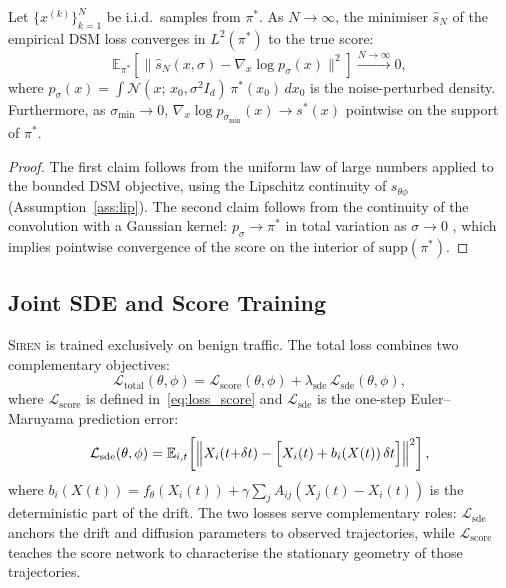 \begin{proposition}
\label{prop:consistency}
Let $\{x^{(k)}\}_{k=1}^N$ be i.i.d.\ samples from $\pi^*$.
As $N \to \infty$, the minimiser $\hat{s}_N$ of the empirical DSM loss
converges in $L^2(\pi^*)$ to the true score:
\begin{equation}
\mathbb{E}_{\pi^*}\!\left[\bigl\|\hat{s}_N(x, \sigma) - \nabla_x \log p_\sigma(x)\bigr\|^2\right]
\xrightarrow{N \to \infty} 0,
\end{equation}
where $p_\sigma(x) = \int \mathcal{N}(x;\, x_0, \sigma^2 I_d)\,\pi^*(x_0)\,dx_0$
is the noise-perturbed density.
Furthermore, as $\sigma_{\min} \to 0$, $\nabla_x \log p_{\sigma_{\min}}(x) \to s^*(x)$
pointwise on the support of $\pi^*$.
\end{proposition}

\begin{proof}
The first claim follows from the uniform law of large numbers applied to the
bounded DSM objective, using the Lipschitz continuity of $s_{\theta\phi}$
(Assumption~\ref{ass:lip}).
The second claim follows from the continuity of the convolution with a
Gaussian kernel: $p_\sigma \to \pi^*$ in total variation as $\sigma \to 0$
\citep[Proposition~3]{Song2019ncsn}, which implies pointwise convergence of
the score on the interior of $\mathrm{supp}(\pi^*)$.
\end{proof}

\subsection{Joint SDE and Score Training}
\label{sec:training}

\textsc{Siren} is trained exclusively on benign traffic.
The total loss combines two complementary objectives:
\begin{equation}\label{eq:loss_total}
\mathcal{L}_{\mathrm{total}}(\theta, \phi)
= \mathcal{L}_{\mathrm{score}}(\theta, \phi)
  + \lambda_{\mathrm{sde}}\,\mathcal{L}_{\mathrm{sde}}(\theta, \phi),
\end{equation}
where $\mathcal{L}_{\mathrm{score}}$ is defined in~\eqref{eq:loss_score} and
$\mathcal{L}_{\mathrm{sde}}$ is the one-step Euler--Maruyama prediction error:
\begin{equation}\label{eq:loss_sde}
\mathcal{L}_{\mathrm{sde}}(\theta, \phi)
= \mathbb{E}_{i, t}\!\left[
    \left\| X_i(t{+}\delta t) -
            \Bigl[X_i(t) + b_i(X(t))\,\delta t\Bigr]
    \right\|^2
  \right],
\end{equation}
where $b_i(X(t)) = f_\theta(X_i(t)) + \gamma\sum_j A_{ij}(X_j(t) - X_i(t))$
is the deterministic part of the drift.
The two losses serve complementary roles: $\mathcal{L}_{\mathrm{sde}}$
anchors the drift and diffusion parameters to observed trajectories, while
$\mathcal{L}_{\mathrm{score}}$ teaches the score network to characterise the
stationary geometry of those trajectories.

